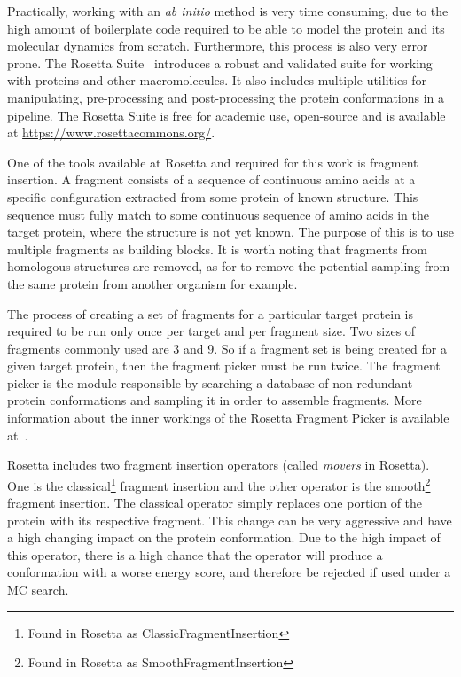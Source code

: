 Practically, working with an \textit{ab initio} method is very time consuming,
due to the high amount of boilerplate code required to be able to model the
protein and its molecular dynamics from scratch. Furthermore, this process is
also very error prone. The Rosetta Suite~\cite{rohl2004protein} introduces a
robust and validated suite for working with proteins and other macromolecules.
It also includes multiple utilities for manipulating, pre-processing and
post-processing the protein conformations in a pipeline. The Rosetta Suite is
free for academic use, open-source and is available at
\url{https://www.rosettacommons.org/}.

One of the tools available at Rosetta and required for this work is fragment
insertion. A fragment consists of a sequence of continuous amino acids at a
specific configuration extracted from some protein of known structure. This
sequence must fully match to some continuous sequence of amino acids in the
target protein, where the structure is not yet known. The purpose of this is to
use multiple fragments as building blocks. It is worth noting that fragments
from homologous structures are removed, as for to remove the potential sampling
from the same protein from another organism for example.

The process of creating a set of fragments for a particular target protein
is required to be run only once per target and per fragment size. Two sizes of
fragments commonly used are 3 and 9. So if a fragment set is being created
for a given target protein, then the fragment picker must be run twice. The
fragment picker is the module responsible by searching a database of
non redundant protein conformations and sampling it in order to assemble
fragments. More information about the inner workings of the Rosetta Fragment
Picker is available at~\cite{gront2011generalized}.

Rosetta includes two fragment insertion operators (called \textit{movers} in
Rosetta). One is the classical\footnote{Found in Rosetta as
ClassicFragmentInsertion} fragment insertion and the other operator is the
smooth\footnote{Found in Rosetta as SmoothFragmentInsertion} fragment
insertion. The classical operator simply replaces one portion of the protein
with its respective fragment. This change can be very aggressive and have a
high changing impact on the protein conformation. Due to the high impact of
this operator, there is a high chance that the operator will produce a
conformation with a worse energy score, and therefore be rejected if used under
a \ac{MC} search.


